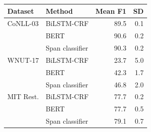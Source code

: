 \begingroup\small\setlength{\tabcolsep}{3pt}
\begin{tabular*}{\linewidth}{@{\extracolsep{\fill}}llrr@{}}
\toprule
Dataset & Method & Mean F1 & SD \\
\midrule
CoNLL-03 & BiLSTM-CRF & 89.5 & 0.1 \\
 & BERT & 90.6 & 0.2 \\
 & Span classifier & 90.3 & 0.2 \\
WNUT-17 & BiLSTM-CRF & 23.7 & 5.0 \\
 & BERT & 42.3 & 1.7 \\
 & Span classifier & 46.8 & 2.0 \\
MIT Rest. & BiLSTM-CRF & 77.7 & 0.2 \\
 & BERT & 77.7 & 0.5 \\
 & Span classifier & 79.1 & 0.7 \\
\bottomrule
\end{tabular*}
\endgroup
